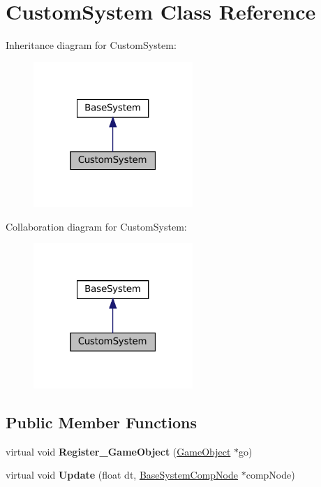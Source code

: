 \hypertarget{classCustomSystem}{}\section{Custom\+System Class Reference}
\label{classCustomSystem}


Inheritance diagram for Custom\+System\+:\nopagebreak
\begin{figure}[H]
\begin{center}
\leavevmode
\includegraphics[width=171pt]{classCustomSystem__inherit__graph}
\end{center}
\end{figure}


Collaboration diagram for Custom\+System\+:\nopagebreak
\begin{figure}[H]
\begin{center}
\leavevmode
\includegraphics[width=171pt]{classCustomSystem__coll__graph}
\end{center}
\end{figure}
\subsection*{Public Member Functions}
\begin{DoxyCompactItemize}
\item 
\mbox{\label{classCustomSystem_a1fe5c399dec16f2a8aff1a5c9e06760e}} 
virtual void {\bfseries Register\+\_\+\+Game\+Object} (\hyperlink{classGameObject}{Game\+Object} $\ast$go)
\item 
\mbox{\label{classCustomSystem_ab8b072ffd6b4de7404b385068d735c61}} 
virtual void {\bfseries Update} (float dt, \hyperlink{structBaseSystemCompNode}{Base\+System\+Comp\+Node} $\ast$comp\+Node)
\end{DoxyCompactItemize}
